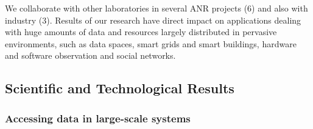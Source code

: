 We collaborate with other laboratories in several ANR projects (6) and also with industry (3). Results of our research have direct impact on applications dealing with huge amounts of data and resources largely distributed in pervasive environments, such as data spaces, smart grids and smart buildings, hardware and software observation and social networks.

\subsection{Scientific and Technological Results} %
\label{sub:hadas_scientific_and_technological_results}

\subsubsection{Accessing data in large-scale systems}
\label{optimisation}

